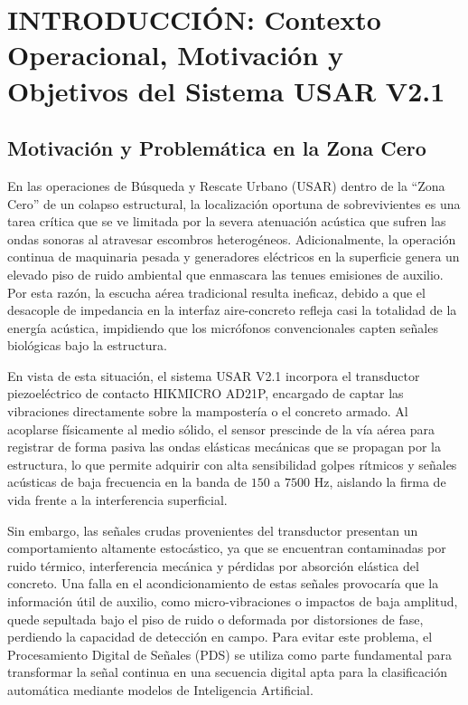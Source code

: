 \documentclass[11pt, a4paper]{article}
\begin{document}
\section{INTRODUCCIÓN: Contexto Operacional, Motivación y Objetivos del Sistema USAR V2.1}

\subsection{Motivación y Problemática en la Zona Cero}
En las operaciones de Búsqueda y Rescate Urbano (USAR) dentro de la ``Zona Cero'' de un colapso estructural, la localización oportuna de sobrevivientes es una tarea crítica que se ve limitada por la severa atenuación acústica que sufren las ondas sonoras al atravesar escombros heterogéneos. Adicionalmente, la operación continua de maquinaria pesada y generadores eléctricos en la superficie genera un elevado piso de ruido ambiental que enmascara las tenues emisiones de auxilio. Por esta razón, la escucha aérea tradicional resulta ineficaz, debido a que el desacople de impedancia en la interfaz aire-concreto refleja casi la totalidad de la energía acústica, impidiendo que los micrófonos convencionales capten señales biológicas bajo la estructura.

En vista de esta situación, el sistema USAR V2.1 incorpora el transductor piezoeléctrico de contacto HIKMICRO AD21P, encargado de captar las vibraciones directamente sobre la mampostería o el concreto armado. Al acoplarse físicamente al medio sólido, el sensor prescinde de la vía aérea para registrar de forma pasiva las ondas elásticas mecánicas que se propagan por la estructura, lo que permite adquirir con alta sensibilidad golpes rítmicos y señales acústicas de baja frecuencia en la banda de $150$ a $7500\text{ Hz}$, aislando la firma de vida frente a la interferencia superficial.

Sin embargo, las señales crudas provenientes del transductor presentan un comportamiento altamente estocástico, ya que se encuentran contaminadas por ruido térmico, interferencia mecánica y pérdidas por absorción elástica del concreto. Una falla en el acondicionamiento de estas señales provocaría que la información útil de auxilio, como micro-vibraciones o impactos de baja amplitud, quede sepultada bajo el piso de ruido o deformada por distorsiones de fase, perdiendo la capacidad de detección en campo. Para evitar este problema, el Procesamiento Digital de Señales (PDS) se utiliza como parte fundamental para transformar la señal continua en una secuencia digital apta para la clasificación automática mediante modelos de Inteligencia Artificial.
\end{document}
